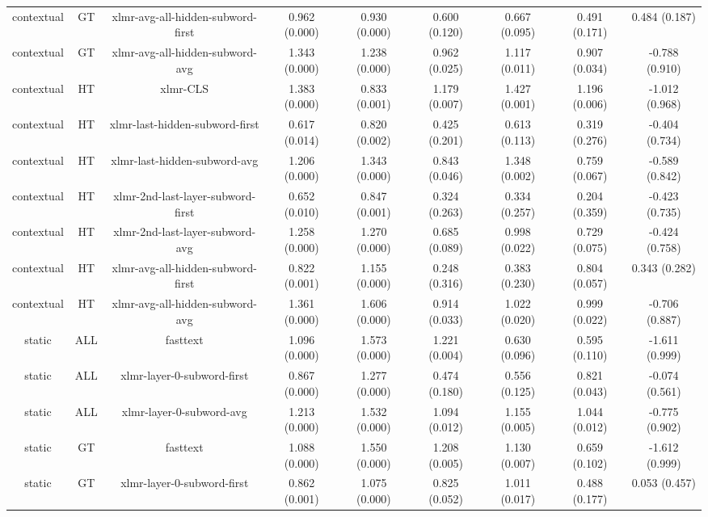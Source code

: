 \begin{sidewaystable}[htb]
\begin{tabular}{@{}ccccccccc@{}}
        contextual & GT & xlmr-avg-all-hidden-subword-first & 0.962 (0.000) & 0.930 (0.000) & 0.600 (0.120) & 0.667 (0.095) & 0.491 (0.171) & 0.484 (0.187) \\
        contextual & GT & xlmr-avg-all-hidden-subword-avg & 1.343 (0.000) & 1.238 (0.000) & 0.962 (0.025) & 1.117 (0.011) & 0.907 (0.034) & -0.788 (0.910) \\
        contextual & HT & xlmr-CLS & 1.383 (0.000) & 0.833 (0.001) & 1.179 (0.007) & 1.427 (0.001) & 1.196 (0.006) & -1.012 (0.968) \\
        contextual & HT & xlmr-last-hidden-subword-first & 0.617 (0.014) & 0.820 (0.002) & 0.425 (0.201) & 0.613 (0.113) & 0.319 (0.276) & -0.404 (0.734) \\
        contextual & HT & xlmr-last-hidden-subword-avg & 1.206 (0.000) & 1.343 (0.000) & 0.843 (0.046) & 1.348 (0.002) & 0.759 (0.067) & -0.589 (0.842) \\
        contextual & HT & xlmr-2nd-last-layer-subword-first & 0.652 (0.010) & 0.847 (0.001) & 0.324 (0.263) & 0.334 (0.257) & 0.204 (0.359) & -0.423 (0.735) \\
        contextual & HT & xlmr-2nd-last-layer-subword-avg & 1.258 (0.000) & 1.270 (0.000) & 0.685 (0.089) & 0.998 (0.022) & 0.729 (0.075) & -0.424 (0.758) \\
        contextual & HT & xlmr-avg-all-hidden-subword-first & 0.822 (0.001) & 1.155 (0.000) & 0.248 (0.316) & 0.383 (0.230) & 0.804 (0.057) & 0.343 (0.282) \\
        contextual & HT & xlmr-avg-all-hidden-subword-avg & 1.361 (0.000) & 1.606 (0.000) & 0.914 (0.033) & 1.022 (0.020) & 0.999 (0.022) & -0.706 (0.887) \\
        static & ALL & fasttext & 1.096 (0.000) & 1.573 (0.000) & 1.221 (0.004) & 0.630 (0.096) & 0.595 (0.110) & -1.611 (0.999) \\
        static & ALL & xlmr-layer-0-subword-first & 0.867 (0.000) & 1.277 (0.000) & 0.474 (0.180) & 0.556 (0.125) & 0.821 (0.043) & -0.074 (0.561) \\
        static & ALL & xlmr-layer-0-subword-avg & 1.213 (0.000) & 1.532 (0.000) & 1.094 (0.012) & 1.155 (0.005) & 1.044 (0.012) & -0.775 (0.902) \\
        static & GT & fasttext & 1.088 (0.000) & 1.550 (0.000) & 1.208 (0.005) & 1.130 (0.007) & 0.659 (0.102) & -1.612 (0.999) \\
        static & GT & xlmr-layer-0-subword-first & 0.862 (0.001) & 1.075 (0.000) & 0.825 (0.052) & 1.011 (0.017) & 0.488 (0.177) & 0.053 (0.457) \\

\end{tabular}
\end{sidewaystable}
